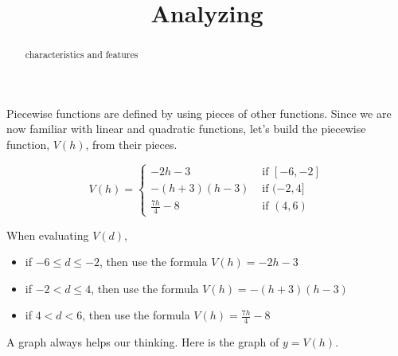 \documentclass{ximera}
\title{Analyzing}
\begin{document}
\begin{abstract}
characteristics and features
\end{abstract}
\maketitle



Piecewise functions are defined by using pieces of other functions. Since we are now familiar with linear and quadratic functions, let's build the piecewise function, $V(h)$, from their pieces.




\[
V(h) = 
\begin{cases}
  -2h-3 & \text{ if } [-6, -2]   \\
  -(h+3)(h-3) & \text{ if } (-2, 4]  \\
  \frac{7h}{4} - 8 & \text{ if } (4,6)
\end{cases}
\]




\begin{idea}

When evaluating $V(d)$, 

\begin{itemize}
  \item if $-6 \leq d \leq -2$, then use the formula $V(h) = -2h - 3$
  \item if $-2 < d \leq 4$, then use the formula $V(h) = -(h+3)(h-3)$
  \item if $4 < d < 6$, then use the formula $V(h) = \frac{7h}{4} - 8$
\end{itemize}

\end{idea}

A graph always helps our thinking. Here is the graph of $y = V(h)$.
\end{document}
